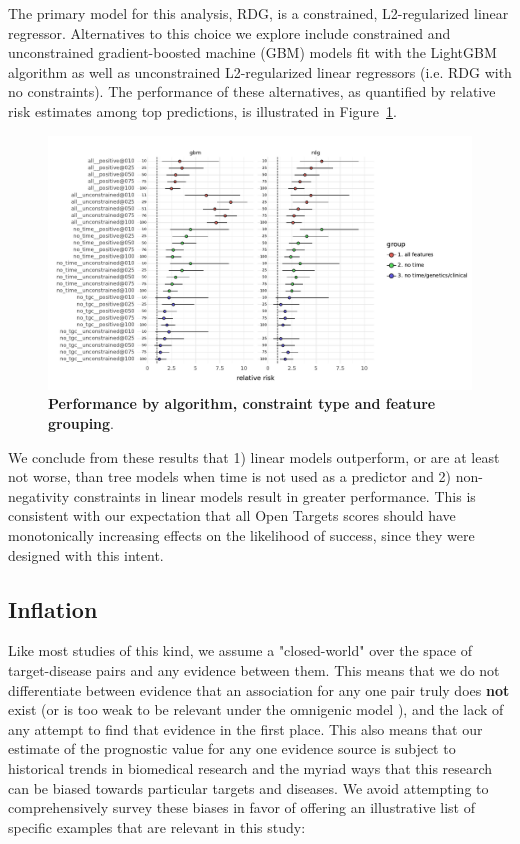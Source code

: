 \documentclass{article}
\begin{document}
The primary model for this analysis, RDG, is a constrained, L2-regularized linear regressor. Alternatives to this choice we explore include constrained and unconstrained gradient-boosted machine (GBM) models fit with the LightGBM \cite{LightGBM} algorithm as well as unconstrained L2-regularized linear regressors (i.e. RDG with no constraints). The performance of these alternatives, as quantified by relative risk estimates among top predictions, is illustrated in Figure~\ref{fig:relative_risk_model_features}. 

\begin{figure}[!htb]
  \centering
  \captionsetup{width=.9\linewidth}
  \includegraphics[width=1\textwidth]{relative_risk_model_features.pdf}
  \caption{
    \textbf{Performance by algorithm, constraint type and feature grouping}.  
  }
  \label{fig:relative_risk_model_features}
\end{figure}

We conclude from these results that 1) linear models outperform, or are at least not worse, than tree models when time is not used as a predictor and 2) non-negativity constraints in linear models result in greater performance. This is consistent with our expectation that all Open Targets scores should have monotonically increasing effects on the likelihood of success, since they were designed with this intent.

\subsection{Inflation}
\label{sec:results_inflation}

Like most studies of this kind, we assume a "closed-world" \cite{Paliwal2020-hr} over the space of target-disease pairs and any evidence between them. This means that we do not differentiate between evidence that an association for any one pair truly does \textbf{not} exist (or is too weak to be relevant under the omnigenic model \cite{PMID:28622505}), and the lack of any attempt to find that evidence in the first place. This also means that our estimate of the prognostic value for any one evidence source is subject to historical trends in biomedical research and the myriad ways that this research can be biased towards particular targets and diseases. We avoid attempting to comprehensively survey these biases in favor of offering an illustrative list of specific examples that are relevant in this study:
\end{document}
